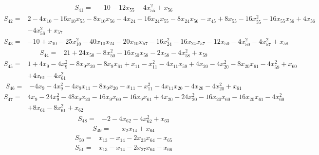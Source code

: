 \begin{align*}
S_{41}={}&-10-12x_{55}-4x_{55}^{2}+x_{56}
\end{align*}
\begin{align*}
S_{42}={}&2-4x_{10}-16x_{10}x_{55}-8x_{10}x_{56}-4x_{24}-16x_{24}x_{55}-8x_{24}x_{56}-x_{45}+8x_{55}-16x_{55}^{2}-16x_{55}x_{56}+4x_{56}\\
{}&-4x_{56}^{2}+x_{57}
\end{align*}
\begin{align*}
S_{43}={}&-10+x_{10}-25x_{10}^{2}-40x_{10}x_{24}-20x_{10}x_{57}-16x_{24}^{2}-16x_{24}x_{57}-12x_{50}-4x_{50}^{2}-4x_{57}^{2}+x_{58}
\end{align*}
\begin{align*}
S_{44}={}&21+24x_{50}-8x_{50}^{2}-16x_{50}x_{58}-2x_{58}-4x_{58}^{2}+x_{59}
\end{align*}
\begin{align*}
S_{45}={}&1+4x_{9}-4x_{9}^{2}-8x_{9}x_{20}-8x_{9}x_{61}+x_{11}-x_{11}^{2}-4x_{11}x_{59}+4x_{20}-4x_{20}^{2}-8x_{20}x_{61}-4x_{59}^{2}+x_{60}\\
{}&+4x_{61}-4x_{61}^{2}
\end{align*}
\begin{align*}
S_{46}={}&-4x_{9}-4x_{9}^{2}-4x_{9}x_{11}-8x_{9}x_{20}-x_{11}-x_{11}^{2}-4x_{11}x_{20}-4x_{20}-4x_{20}^{2}+x_{61}
\end{align*}
\begin{align*}
S_{47}={}&4x_{9}-24x_{9}^{2}-48x_{9}x_{20}-16x_{9}x_{60}-16x_{9}x_{61}+4x_{20}-24x_{20}^{2}-16x_{20}x_{60}-16x_{20}x_{61}-4x_{60}^{2}\\
{}&+8x_{61}-8x_{61}^{2}+x_{62}
\end{align*}
\begin{align*}
S_{48}={}&-2-4x_{62}-4x_{62}^{2}+x_{63}
\end{align*}
\begin{align*}
S_{49}={}&-x_{2}x_{14}+x_{64}
\end{align*}
\begin{align*}
S_{50}={}&x_{13}-x_{14}-2x_{23}x_{64}-x_{65}
\end{align*}
\begin{align*}
S_{51}={}&x_{13}-x_{14}-2x_{27}x_{64}-x_{66}
\end{align*}
